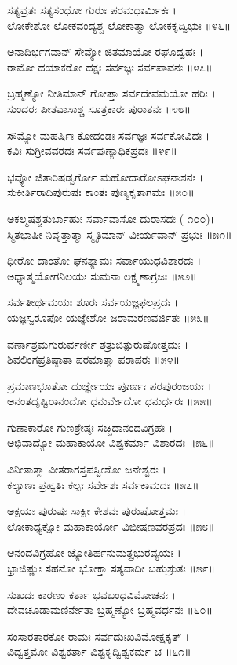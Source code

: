 ಸತ್ಯವ್ರತಃ ಸತ್ಯಸಂಧೋ ಗುರುಃ ಪರಮಧಾರ್ಮಿಕಃ ।\\
ಲೋಕೇಶೋ ಲೋಕವಂದ್ಯಶ್ಚ ಲೋಕಾತ್ಮಾ ಲೋಕಕೃದ್ವಿಭುಃ ॥೪೬॥

ಅನಾದಿರ್ಭಗವಾನ್ ಸೇವ್ಯೋ ಜಿತಮಾಯೋ ರಘೂದ್ವಹಃ ।\\
ರಾಮೋ ದಯಾಕರೋ ದಕ್ಷಃ ಸರ್ವಜ್ಞಃ ಸರ್ವಪಾವನಃ ॥೪೭॥

ಬ್ರಹ್ಮಣ್ಯೋ ನೀತಿಮಾನ್ ಗೋಪ್ತಾ ಸರ್ವದೇವಮಯೋ ಹರಿಃ ।\\
ಸುಂದರಃ ಪೀತವಾಸಾಶ್ಚ ಸೂತ್ರಕಾರಃ ಪುರಾತನಃ ॥೪೮॥

ಸೌಮ್ಯೋ ಮಹರ್ಷಿಃ ಕೋದಂಡಃ ಸರ್ವಜ್ಞಃ ಸರ್ವಕೋವಿದಃ ।\\
ಕವಿಃ ಸುಗ್ರೀವವರದಃ ಸರ್ವಪುಣ್ಯಾಧಿಕಪ್ರದಃ ॥೪೯॥

ಭವ್ಯೋ ಜಿತಾರಿಷಡ್ವರ್ಗೋ ಮಹೋದಾರೋಽಘನಾಶನಃ ।\\
ಸುಕೀರ್ತಿರಾದಿಪುರುಷಃ ಕಾಂತಃ ಪುಣ್ಯಕೃತಾಗಮಃ ॥೫೦॥

ಅಕಲ್ಮಷಶ್ಚತುರ್ಬಾಹುಃ ಸರ್ವಾವಾಸೋ ದುರಾಸದಃ ( ೧೦೦)।\\
ಸ್ಮಿತಭಾಷೀ ನಿವೃತ್ತಾತ್ಮಾ ಸ್ಮೃತಿಮಾನ್ ವೀರ್ಯವಾನ್ ಪ್ರಭುಃ ॥೫೧॥

ಧೀರೋ ದಾಂತೋ ಘನಶ್ಯಾಮಃ ಸರ್ವಾಯುಧವಿಶಾರದಃ ।\\
ಅಧ್ಯಾತ್ಮಯೋಗನಿಲಯಃ ಸುಮನಾ ಲಕ್ಷ್ಮಣಾಗ್ರಜಃ ॥೫೨॥

ಸರ್ವತೀರ್ಥಮಯಃ ಶೂರಃ ಸರ್ವಯಜ್ಞಫಲಪ್ರದಃ ।\\
ಯಜ್ಞಸ್ವರೂಪೋ ಯಜ್ಞೇಶೋ ಜರಾಮರಣವರ್ಜಿತಃ ॥೫೩॥

ವರ್ಣಾಶ್ರಮಗುರುರ್ವರ್ಣೀ ಶತ್ರುಜಿತ್ಪುರುಷೋತ್ತಮಃ ।\\
ಶಿವಲಿಂಗಪ್ರತಿಷ್ಠಾತಾ ಪರಮಾತ್ಮಾ ಪರಾಪರಃ ॥೫೪॥

ಪ್ರಮಾಣಭೂತೋ ದುರ್ಜ್ಞೇಯಃ ಪೂರ್ಣಃ ಪರಪುರಂಜಯಃ ।\\
ಅನಂತದೃಷ್ಟಿರಾನಂದೋ ಧನುರ್ವೇದೋ ಧನುರ್ಧರಃ ॥೫೫॥

ಗುಣಾಕಾರೋ ಗುಣಶ್ರೇಷ್ಠಃ ಸಚ್ಚಿದಾನಂದವಿಗ್ರಹಃ ।\\
ಅಭಿವಾದ್ಯೋ ಮಹಾಕಾಯೋ ವಿಶ್ವಕರ್ಮಾ ವಿಶಾರದಃ ॥೫೬॥

ವಿನೀತಾತ್ಮಾ ವೀತರಾಗಸ್ತಪಸ್ವೀಶೋ ಜನೇಶ್ವರಃ ।\\
ಕಲ್ಯಾಣಃ ಪ್ರಹ್ವತಿಃ ಕಲ್ಪಃ ಸರ್ವೇಶಃ ಸರ್ವಕಾಮದಃ ॥೫೭॥

ಅಕ್ಷಯಃ ಪುರುಷಃ ಸಾಕ್ಷೀ ಕೇಶವಃ ಪುರುಷೋತ್ತಮಃ ।\\
ಲೋಕಾಧ್ಯಕ್ಷೋ ಮಹಾಕಾರ್ಯೋ ವಿಭೀಷಣವರಪ್ರದಃ ॥೫೮॥

ಆನಂದವಿಗ್ರಹೋ ಜ್ಯೋತಿರ್ಹನುಮತ್ಪ್ರಭುರವ್ಯಯಃ ।\\
ಭ್ರಾಜಿಷ್ಣುಃ ಸಹನೋ ಭೋಕ್ತಾ ಸತ್ಯವಾದೀ ಬಹುಶ್ರುತಃ ॥೫೯॥

ಸುಖದಃ ಕಾರಣಂ ಕರ್ತಾ ಭವಬಂಧವಿಮೋಚನಃ ।\\
ದೇವಚೂಡಾಮಣಿರ್ನೇತಾ ಬ್ರಹ್ಮಣ್ಯೋ ಬ್ರಹ್ಮವರ್ಧನಃ ॥೬೦॥

ಸಂಸಾರತಾರಕೋ ರಾಮಃ ಸರ್ವದುಃಖವಿಮೋಕ್ಷಕೃತ್ ।\\
ವಿದ್ವತ್ತಮೋ ವಿಶ್ವಕರ್ತಾ ವಿಶ್ವಕೃದ್ವಿಶ್ವಕರ್ಮ ಚ ॥೬೧॥

